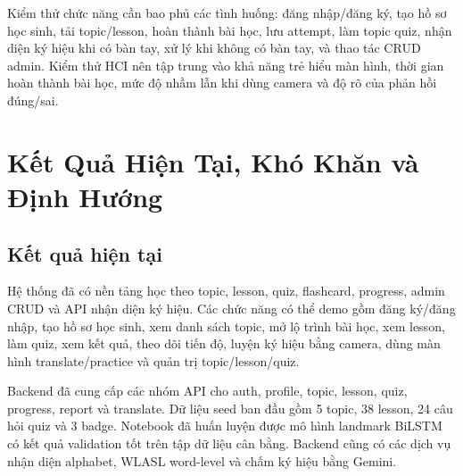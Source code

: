\documentclass[conference]{IEEEtran}
\begin{document}
Kiểm thử chức năng cần bao phủ các tình huống: đăng nhập/đăng ký, tạo hồ sơ học sinh, tải topic/lesson, hoàn thành bài học, lưu attempt, làm topic quiz, nhận diện ký hiệu khi có bàn tay, xử lý khi không có bàn tay, và thao tác CRUD admin. Kiểm thử HCI nên tập trung vào khả năng trẻ hiểu màn hình, thời gian hoàn thành bài học, mức độ nhầm lẫn khi dùng camera và độ rõ của phản hồi đúng/sai.

\section{Kết Quả Hiện Tại, Khó Khăn và Định Hướng}
\subsection{Kết quả hiện tại}
Hệ thống đã có nền tảng học theo topic, lesson, quiz, flashcard, progress, admin CRUD và API nhận diện ký hiệu. Các chức năng có thể demo gồm đăng ký/đăng nhập, tạo hồ sơ học sinh, xem danh sách topic, mở lộ trình bài học, xem lesson, làm quiz, xem kết quả, theo dõi tiến độ, luyện ký hiệu bằng camera, dùng màn hình translate/practice và quản trị topic/lesson/quiz.

Backend đã cung cấp các nhóm API cho auth, profile, topic, lesson, quiz, progress, report và translate. Dữ liệu seed ban đầu gồm 5 topic, 38 lesson, 24 câu hỏi quiz và 3 badge. Notebook đã huấn luyện được mô hình landmark BiLSTM có kết quả validation tốt trên tập dữ liệu cân bằng. Backend cũng có các dịch vụ nhận diện alphabet, WLASL word-level và chấm ký hiệu bằng Gemini.
\end{document}
